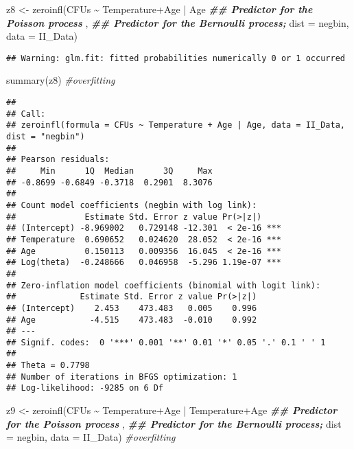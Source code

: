 \documentclass[
]{article}
\newenvironment{Shaded}{\begin{snugshade}}{\end{snugshade}}
\newcommand{\AttributeTok}[1]{\textcolor[rgb]{0.77,0.63,0.00}{#1}}
\newcommand{\CommentTok}[1]{\textcolor[rgb]{0.56,0.35,0.01}{\textit{#1}}}
\newcommand{\DocumentationTok}[1]{\textcolor[rgb]{0.56,0.35,0.01}{\textbf{\textit{#1}}}}
\newcommand{\FunctionTok}[1]{\textcolor[rgb]{0.00,0.00,0.00}{#1}}
\newcommand{\NormalTok}[1]{#1}
\newcommand{\OtherTok}[1]{\textcolor[rgb]{0.56,0.35,0.01}{#1}}
\newcommand{\SpecialCharTok}[1]{\textcolor[rgb]{0.00,0.00,0.00}{#1}}
\newcommand{\StringTok}[1]{\textcolor[rgb]{0.31,0.60,0.02}{#1}}
\begin{document}
\begin{Shaded}
\begin{Highlighting}[]
\NormalTok{z8 }\OtherTok{\textless{}{-}} \FunctionTok{zeroinfl}\NormalTok{(CFUs }\SpecialCharTok{\textasciitilde{}}\NormalTok{ Temperature}\SpecialCharTok{+}\NormalTok{Age }\SpecialCharTok{|}\NormalTok{ Age }\DocumentationTok{\#\# Predictor for the Poisson process}
\NormalTok{               , }\DocumentationTok{\#\# Predictor for the Bernoulli process;}
               \AttributeTok{dist =} \StringTok{\textquotesingle{}negbin\textquotesingle{}}\NormalTok{,}
               \AttributeTok{data =}\NormalTok{ II\_Data)}
\end{Highlighting}
\end{Shaded}

\begin{verbatim}
## Warning: glm.fit: fitted probabilities numerically 0 or 1 occurred
\end{verbatim}

\begin{Shaded}
\begin{Highlighting}[]
\FunctionTok{summary}\NormalTok{(z8) }\CommentTok{\#overfitting}
\end{Highlighting}
\end{Shaded}

\begin{verbatim}
## 
## Call:
## zeroinfl(formula = CFUs ~ Temperature + Age | Age, data = II_Data, dist = "negbin")
## 
## Pearson residuals:
##     Min      1Q  Median      3Q     Max 
## -0.8699 -0.6849 -0.3718  0.2901  8.3076 
## 
## Count model coefficients (negbin with log link):
##              Estimate Std. Error z value Pr(>|z|)    
## (Intercept) -8.969002   0.729148 -12.301  < 2e-16 ***
## Temperature  0.690652   0.024620  28.052  < 2e-16 ***
## Age          0.150113   0.009356  16.045  < 2e-16 ***
## Log(theta)  -0.248666   0.046958  -5.296 1.19e-07 ***
## 
## Zero-inflation model coefficients (binomial with logit link):
##             Estimate Std. Error z value Pr(>|z|)
## (Intercept)    2.453    473.483   0.005    0.996
## Age           -4.515    473.483  -0.010    0.992
## ---
## Signif. codes:  0 '***' 0.001 '**' 0.01 '*' 0.05 '.' 0.1 ' ' 1 
## 
## Theta = 0.7798 
## Number of iterations in BFGS optimization: 1 
## Log-likelihood: -9285 on 6 Df
\end{verbatim}

\begin{Shaded}
\begin{Highlighting}[]
\NormalTok{z9 }\OtherTok{\textless{}{-}} \FunctionTok{zeroinfl}\NormalTok{(CFUs }\SpecialCharTok{\textasciitilde{}}\NormalTok{ Temperature}\SpecialCharTok{+}\NormalTok{Age }\SpecialCharTok{|}\NormalTok{ Temperature}\SpecialCharTok{+}\NormalTok{Age }\DocumentationTok{\#\# Predictor for the Poisson process}
\NormalTok{               , }\DocumentationTok{\#\# Predictor for the Bernoulli process;}
               \AttributeTok{dist =} \StringTok{\textquotesingle{}negbin\textquotesingle{}}\NormalTok{,}
               \AttributeTok{data =}\NormalTok{ II\_Data) }\CommentTok{\#overfitting}
\end{Highlighting}
\end{Shaded}
\end{document}
